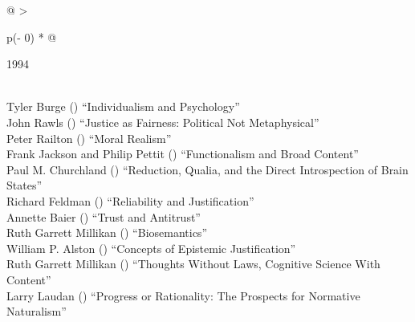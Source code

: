 \documentclass[
  10pt,
  letterpaper,
  DIV=11,
  numbers=noendperiod,
  twoside]{scrartcl}
\begin{document}
\begin{longtable}[]{@{}
  >{\raggedright\arraybackslash}p{(\columnwidth - 0\tabcolsep) * }@{}}

\caption{\label{tbl-top-ten-1985}Most cited articles published less than
ten years ago as of 1994.}

\tabularnewline

\toprule\noalign{}
\begin{minipage}[b]{\linewidth}\raggedright
1994
\end{minipage} \\
\midrule\noalign{}
\endhead
\bottomrule\noalign{}
\endlastfoot
Tyler Burge
()
``Individualism and Psychology'' \\
John Rawls
()
``Justice as Fairness: Political Not Metaphysical'' \\
Peter Railton
()
``Moral Realism'' \\
Frank Jackson and Philip Pettit
()
``Functionalism and Broad Content'' \\
Paul M. Churchland
()
``Reduction, Qualia, and the Direct Introspection of Brain States'' \\
Richard Feldman
()
``Reliability and Justification'' \\
Annette Baier
()
``Trust and Antitrust'' \\
Ruth Garrett Millikan
()
``Biosemantics'' \\
William P. Alston
()
``Concepts of Epistemic Justification'' \\
Ruth Garrett Millikan
()
``Thoughts Without Laws, Cognitive Science With Content'' \\
Larry Laudan
()
``Progress or Rationality: The Prospects for Normative Naturalism'' \\

\end{longtable}
\end{document}
